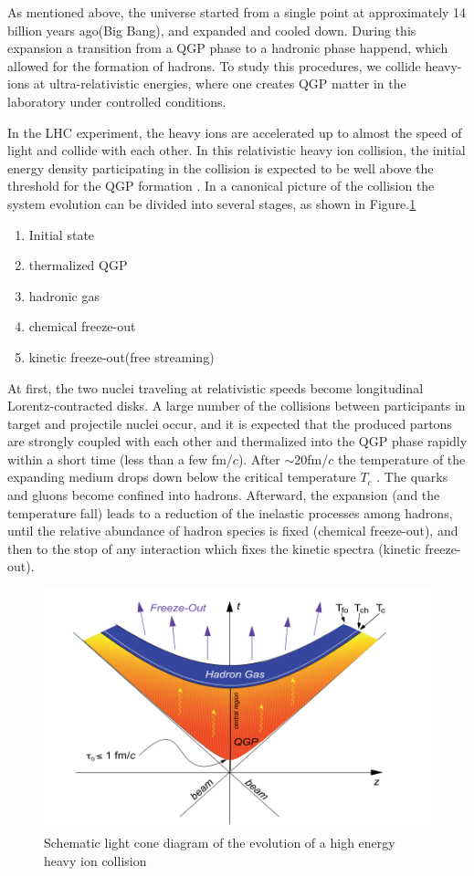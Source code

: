 As mentioned above, the universe started from a single point at approximately 14 billion years ago(Big Bang), and expanded and cooled down. During this expansion a transition from a QGP phase to a hadronic phase happend, which allowed for the formation of hadrons.  To study this procedures, we collide heavy-ions at ultra-relativistic energies, where one creates QGP matter in the laboratory under controlled conditions. 

In the LHC experiment, the heavy ions are accelerated up to almost the speed of light and collide with each other. In this relativistic heavy ion collision, the initial energy density participating in the collision is expected to be well above the threshold for the QGP formation \cite{PhysRevD.27.140}.  In a canonical picture of the collision \cite{Kolb:2003dz} the system evolution can be divided into several stages, as shown in Figure.\ref{fig2}
  \begin{enumerate}
 	\item Initial state
 	\item thermalized QGP
 	\item hadronic gas
 	\item chemical freeze-out
 	\item kinetic freeze-out(free streaming)
 \end{enumerate}
 
 	At first, the two nuclei traveling at relativistic speeds become longitudinal Lorentz-contracted disks. A large number of the collisions between participants in target and projectile nuclei occur, and it is expected that the produced partons are strongly coupled with each other and thermalized into the QGP phase rapidly within a short time (less than a few fm/$c$). After $\sim 20$fm/$c$ the temperature of the expanding medium drops down below the critical temperature $T_c$ \cite{Rapp2011}. The quarks and gluons become confined into hadrons.  Afterward, the expansion (and the temperature fall) leads to a reduction of the inelastic processes among hadrons, until the relative abundance of hadron species is fixed (chemical freeze-out), and then to the stop of any interaction which fixes the kinetic spectra (kinetic freeze-out).
 	
 
\begin{figure}[h]
\centerline{\includegraphics[width=13.0cm]{figures/system_evol}}
\caption{Schematic light cone diagram of the evolution of a high energy
heavy ion collision}
\label{fig2}
\end{figure}

